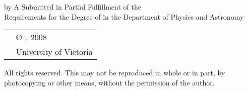 \pagebreak
{
	\centering
	\thesistitle
	\tpbreak
	by
	\tpbreak
	\nameanddegrees
	\tpbreak
	A \PhDorMas Submitted in Partial Fulfillment of the \\
	Requirements for the Degree of
	\tpbreak
	\PhDorMaster
	\tpbreak
	in the Department of Physics and Astronomy\\
	\vfill
	\begin{tabular}{cl}
		& \copyright\ \yourname, 2008\\
		& \phantom{\copyright} University of Victoria
	\end{tabular}
	\tpbreak
	All rights reserved. This \PhDorMas may not be reproduced in whole or in part, by \\
	\hfill photocopying or other means, without the permission of the author. 
	\hfill
}
\pagebreak
